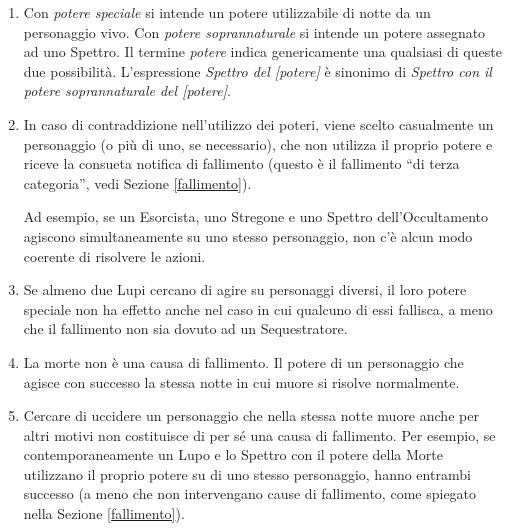 \documentclass[a4paper,10pt]{article}
\begin{document}
\begin{enumerate}
	
	\item Con \emph{potere speciale} si intende un potere utilizzabile di notte da un personaggio vivo. Con \emph{potere soprannaturale} si intende un potere assegnato ad uno Spettro. Il termine \emph{potere} indica genericamente una qualsiasi di queste due possibilità. L'espressione \emph{Spettro del [potere]} è sinonimo di \emph{Spettro con il potere soprannaturale del [potere]}.
	
	\item In caso di contraddizione nell'utilizzo dei poteri, viene scelto casualmente un personaggio (o più di uno, se necessario), che non utilizza il proprio potere e riceve la consueta notifica di fallimento (questo è il fallimento ``di terza categoria'', vedi Sezione \ref{fallimento}).
 
	Ad esempio, se un Esorcista, uno Stregone e uno Spettro dell'Occultamento agiscono simultaneamente su uno stesso personaggio, non c'è alcun modo coerente di risolvere le azioni.
	
	
	\item Se almeno due Lupi cercano di agire su personaggi diversi, il loro potere speciale non ha effetto anche nel caso in cui qualcuno di essi fallisca, a meno che il fallimento non sia dovuto ad un Sequestratore.
	
	
	\item La morte non è una causa di fallimento. Il potere di un personaggio che agisce con successo la stessa notte in cui muore si risolve normalmente.
	
	\item Cercare di uccidere un personaggio che nella stessa notte muore anche per altri motivi non costituisce di per sé una causa di fallimento.
	Per esempio, se contemporaneamente un Lupo e lo Spettro con il potere della Morte utilizzano il proprio potere su di uno stesso personaggio, hanno entrambi successo (a meno che non intervengano cause di fallimento, come spiegato nella Sezione \ref{fallimento}).
	

\end{enumerate}
\end{document}
